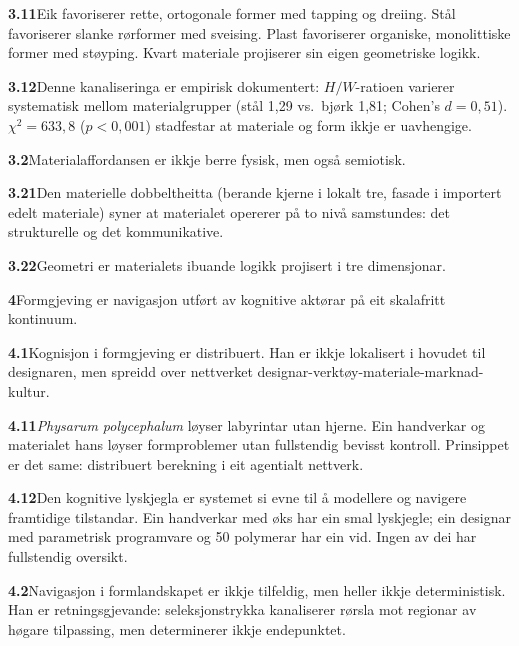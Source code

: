 \documentclass[12pt, a4paper]{article}
\begin{document}
\medskip
\noindent\textbf{3.11}\quad Eik favoriserer rette, ortogonale former med tapping og dreiing. Stål favoriserer slanke rørformer med sveising. Plast favoriserer organiske, monolittiske former med støyping. Kvart materiale projiserer sin eigen geometriske logikk.

\medskip
\noindent\textbf{3.12}\quad Denne kanaliseringa er empirisk dokumentert: $H/W$-ratioen varierer systematisk mellom materialgrupper (stål 1,29 vs.\ bjørk 1,81; Cohen's $d = 0{,}51$). $\chi^2 = 633{,}8$ ($p < 0{,}001$) stadfestar at materiale og form ikkje er uavhengige.

\medskip
\noindent\textbf{3.2}\quad Materialaffordansen er ikkje berre fysisk, men også semiotisk.

\medskip
\noindent\textbf{3.21}\quad Den materielle dobbeltheitta (berande kjerne i lokalt tre, fasade i importert edelt materiale) syner at materialet opererer på to nivå samstundes: det strukturelle og det kommunikative.

\medskip
\noindent\textbf{3.22}\quad Geometri er materialets ibuande logikk projisert i tre dimensjonar.

\bigskip

\noindent\textbf{4}\quad Formgjeving er navigasjon utført av kognitive aktørar på eit skalafritt kontinuum.

\medskip
\noindent\textbf{4.1}\quad Kognisjon i formgjeving er distribuert. Han er ikkje lokalisert i hovudet til designaren, men spreidd over nettverket designar-verktøy-materiale-marknad-kultur.

\medskip
\noindent\textbf{4.11}\quad \textit{Physarum polycephalum} løyser labyrintar utan hjerne. Ein handverkar og materialet hans løyser formproblemer utan fullstendig bevisst kontroll. Prinsippet er det same: distribuert berekning i eit agentialt nettverk.

\medskip
\noindent\textbf{4.12}\quad Den kognitive lyskjegla \citep{levin2019} er systemet si evne til å modellere og navigere framtidige tilstandar. Ein handverkar med øks har ein smal lyskjegle; ein designar med parametrisk programvare og 50 polymerar har ein vid. Ingen av dei har fullstendig oversikt.

\medskip
\noindent\textbf{4.2}\quad Navigasjon i formlandskapet er ikkje tilfeldig, men heller ikkje deterministisk. Han er retningsgjevande: seleksjonstrykka kanaliserer rørsla mot regionar av høgare tilpassing, men determinerer ikkje endepunktet.

\bigskip
\end{document}
